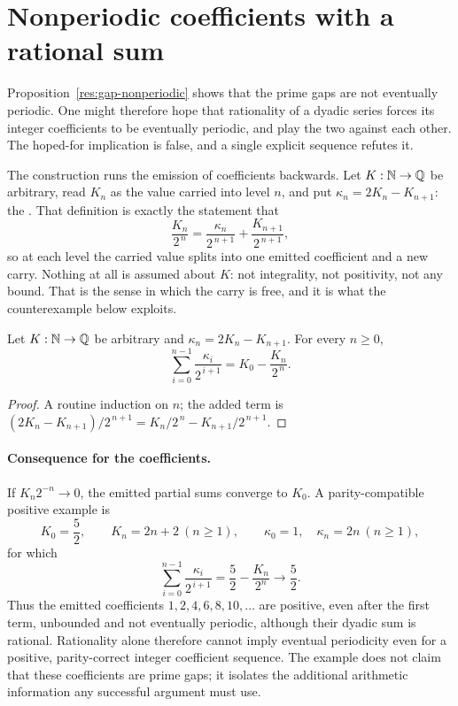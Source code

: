 \documentclass[11pt]{article}
\begin{document}
\section{Nonperiodic coefficients with a rational sum}\label{sec:carry}

Proposition~\ref{res:gap-nonperiodic} shows that the prime gaps are not
eventually periodic.  One might therefore hope that rationality of a dyadic
series forces its integer coefficients to be eventually periodic, and play the
two against each other.  The hoped-for implication is false, and a single
explicit sequence refutes it.

The construction runs the emission of coefficients backwards.  Let
$K:\mathbb{N}\to\mathbb{Q}$ be arbitrary, read $K_n$ as the value carried into level $n$, and
put $\kappa_n=2K_n-K_{n+1}$: the
.
That definition is exactly the statement that
\[
 \frac{K_n}{2^{\,n}}
 =\frac{\kappa_n}{2^{\,n+1}}+\frac{K_{n+1}}{2^{\,n+1}} ,
\]
so at each level the carried value splits into one emitted coefficient and a
new carry.  Nothing at all is assumed about $K$: not integrality, not
positivity, not any bound.  That is the sense in which the carry is free, and
it is what the counterexample below exploits.

\begin{proposition}\label{res:telescope}
Let $K:\mathbb{N}\to\mathbb{Q}$ be arbitrary and $\kappa_n=2K_n-K_{n+1}$.  For every $n\ge0$,
\[
 \sum_{i=0}^{n-1}\frac{\kappa_i}{2^{\,i+1}}=K_0-\frac{K_n}{2^{\,n}} .
\]
\end{proposition}

\begin{proof}
A routine induction on $n$; the added term is
$(2K_n-K_{n+1})/2^{\,n+1}=K_n/2^{\,n}-K_{n+1}/2^{\,n+1}$.
\end{proof}

\paragraph{Consequence for the coefficients.}
If $K_n2^{-n}\to0$, the emitted partial sums converge to $K_0$.  A
parity-compatible positive example is
\[
 K_0=\frac52,\qquad K_n=2n+2\ (n\ge1),\qquad
 \kappa_0=1,\quad\kappa_n=2n\ (n\ge1),
\]
for which
\[
 \sum_{i=0}^{n-1}\frac{\kappa_i}{2^{\,i+1}}
   =\frac52-\frac{K_n}{2^n}\longrightarrow\frac52.
\]
Thus the emitted coefficients $1,2,4,6,8,10,\ldots$ are positive, even after
the first term, unbounded and not eventually periodic, although their dyadic
sum is rational.  Rationality alone therefore cannot imply eventual
periodicity even for a positive, parity-correct integer coefficient sequence.
The example does not claim that these coefficients are prime gaps; it isolates
the additional arithmetic information any successful argument must use.
\end{document}
